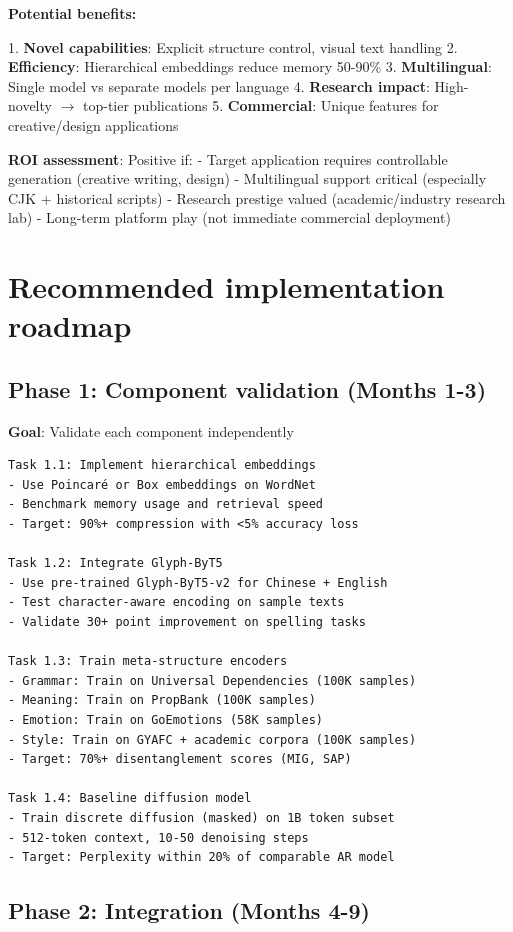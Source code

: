 \documentclass[11pt]{article}
\begin{document}
\textbf{Potential benefits:}

1. \textbf{Novel capabilities}: Explicit structure control, visual text handling
2. \textbf{Efficiency}: Hierarchical embeddings reduce memory 50-90\%
3. \textbf{Multilingual}: Single model vs separate models per language
4. \textbf{Research impact}: High-novelty \(\to\) top-tier publications
5. \textbf{Commercial}: Unique features for creative/design applications

\textbf{ROI assessment}: Positive if:
- Target application requires controllable generation (creative writing, design)
- Multilingual support critical (especially CJK + historical scripts)
- Research prestige valued (academic/industry research lab)
- Long-term platform play (not immediate commercial deployment)

\section{Recommended implementation roadmap}

\subsection{Phase 1: Component validation (Months 1-3)}

\textbf{Goal}: Validate each component independently

\begin{verbatim}
Task 1.1: Implement hierarchical embeddings
- Use Poincaré or Box embeddings on WordNet
- Benchmark memory usage and retrieval speed
- Target: 90%+ compression with <5% accuracy loss

Task 1.2: Integrate Glyph-ByT5
- Use pre-trained Glyph-ByT5-v2 for Chinese + English
- Test character-aware encoding on sample texts
- Validate 30+ point improvement on spelling tasks

Task 1.3: Train meta-structure encoders
- Grammar: Train on Universal Dependencies (100K samples)
- Meaning: Train on PropBank (100K samples)
- Emotion: Train on GoEmotions (58K samples)
- Style: Train on GYAFC + academic corpora (100K samples)
- Target: 70%+ disentanglement scores (MIG, SAP)

Task 1.4: Baseline diffusion model
- Train discrete diffusion (masked) on 1B token subset
- 512-token context, 10-50 denoising steps
- Target: Perplexity within 20% of comparable AR model
\end{verbatim}

\subsection{Phase 2: Integration (Months 4-9)}
\end{document}
